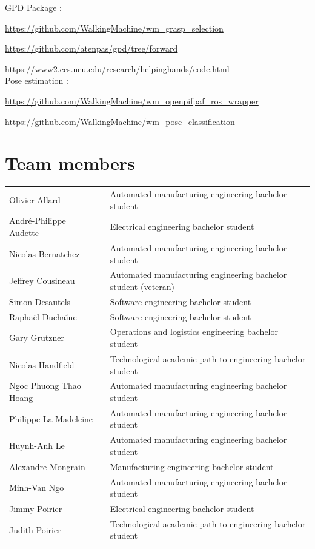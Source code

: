 \documentclass[runningheads,a4paper]{llncs}
\begin{document}
GPD Package :

\url{https://github.com/WalkingMachine/wm_grasp_selection}

\url{https://github.com/atenpas/gpd/tree/forward}

\url{https://www2.ccs.neu.edu/research/helpinghands/code.html} \\

Pose estimation :

\url{https://github.com/WalkingMachine/wm_openpifpaf_ros_wrapper}

\url{https://github.com/WalkingMachine/wm_pose_classification} \\

\section*{Team members}

\begin{tabular}{lll}
   
Olivier Allard &    & 	Automated manufacturing engineering bachelor student \\
André-Philippe Audette &    & 	Electrical engineering bachelor student \\
Nicolas Bernatchez &    & 		Automated manufacturing engineering bachelor student \\
Jeffrey Cousineau &    & 		Automated manufacturing engineering bachelor student (veteran) \\
Simon Desautels &    & 		Software engineering bachelor student \\
Raphaël Duchaîne &    & 		Software engineering bachelor student \\
Gary Grutzner &    & 	Operations and logistics engineering bachelor student \\ 
Nicolas Handfield &    & 	Technological academic path to engineering bachelor student \\ 
Ngoc Phuong Thao Hoang &    & 	Automated manufacturing engineering bachelor student \\ 
Philippe La Madeleine &    & 	Automated manufacturing engineering bachelor student \\ 
Huynh-Anh Le &    & 			Automated manufacturing engineering bachelor student \\
Alexandre Mongrain  &    & 		Manufacturing engineering bachelor student \\
Minh-Van Ngo  &    & 		Automated manufacturing engineering bachelor student \\
Jimmy Poirier &    & 			Electrical engineering bachelor student \\
Judith Poirier &    & 			Technological academic path to engineering bachelor student \\

\end{tabular}
\end{document}
